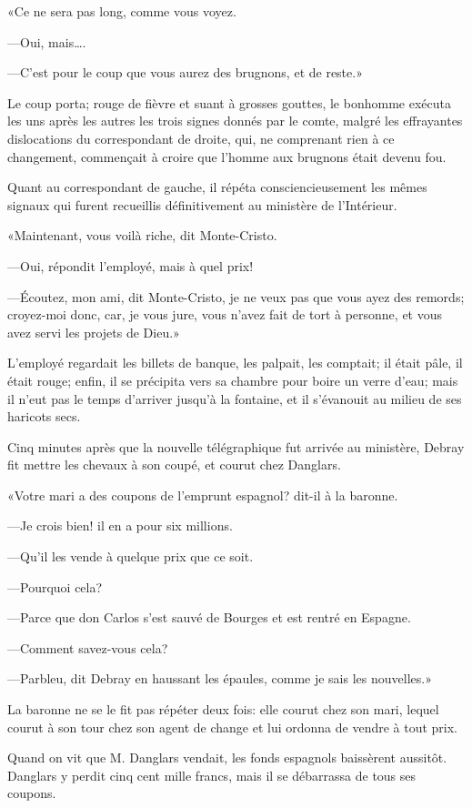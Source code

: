 «Ce ne sera pas long, comme vous voyez. 

—Oui, mais\dots. 

—C'est pour le coup que vous aurez des brugnons, et de reste.» 

Le coup porta; rouge de fièvre et suant à grosses gouttes, le bonhomme exécuta les uns après les autres les trois signes donnés par le comte, malgré les effrayantes dislocations du correspondant de droite, qui, ne comprenant rien à ce changement, commençait à croire que l'homme aux brugnons était devenu fou. 

Quant au correspondant de gauche, il répéta consciencieusement les mêmes signaux qui furent recueillis définitivement au ministère de l'Intérieur. 

«Maintenant, vous voilà riche, dit Monte-Cristo. 

—Oui, répondit l'employé, mais à quel prix! 

—Écoutez, mon ami, dit Monte-Cristo, je ne veux pas que vous ayez des remords; croyez-moi donc, car, je vous jure, vous n'avez fait de tort à personne, et vous avez servi les projets de Dieu.» 

L'employé regardait les billets de banque, les palpait, les comptait; il était pâle, il était rouge; enfin, il se précipita vers sa chambre pour boire un verre d'eau; mais il n'eut pas le temps d'arriver jusqu'à la fontaine, et il s'évanouit au milieu de ses haricots secs. 

Cinq minutes après que la nouvelle télégraphique fut arrivée au ministère, Debray fit mettre les chevaux à son coupé, et courut chez Danglars. 

«Votre mari a des coupons de l'emprunt espagnol? dit-il à la baronne. 

—Je crois bien! il en a pour six millions. 

—Qu'il les vende à quelque prix que ce soit. 

—Pourquoi cela? 

—Parce que don Carlos s'est sauvé de Bourges et est rentré en Espagne. 

—Comment savez-vous cela? 

—Parbleu, dit Debray en haussant les épaules, comme je sais les nouvelles.» 

La baronne ne se le fit pas répéter deux fois: elle courut chez son mari, lequel courut à son tour chez son agent de change et lui ordonna de vendre à tout prix. 

Quand on vit que M. Danglars vendait, les fonds espagnols baissèrent aussitôt. Danglars y perdit cinq cent mille francs, mais il se débarrassa de tous ses coupons. 

